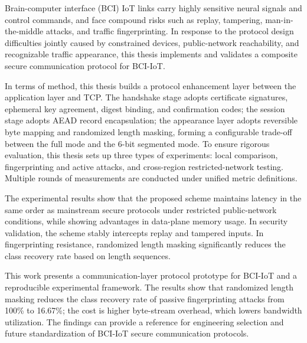 \begin{englishabstract}
Brain-computer interface (BCI) IoT links carry highly sensitive neural signals and control commands, and face compound risks such as replay, tampering, man-in-the-middle attacks, and traffic fingerprinting. In response to the protocol design difficulties jointly caused by constrained devices, public-network reachability, and recognizable traffic appearance, this thesis implements and validates a composite secure communication protocol for BCI-IoT.

In terms of method, this thesis builds a protocol enhancement layer between the application layer and TCP. The handshake stage adopts certificate signatures, ephemeral key agreement, digest binding, and confirmation codes; the session stage adopts AEAD record encapsulation; the appearance layer adopts reversible byte mapping and randomized length masking, forming a configurable trade-off between the full mode and the 6-bit segmented mode. To ensure rigorous evaluation, this thesis sets up three types of experiments: local comparison, fingerprinting and active attacks, and cross-region restricted-network testing. Multiple rounds of measurements are conducted under unified metric definitions.

The experimental results show that the proposed scheme maintains latency in the same order as mainstream secure protocols under restricted public-network conditions, while showing advantages in data-plane memory usage. In security validation, the scheme stably intercepts replay and tampered inputs. In fingerprinting resistance, randomized length masking significantly reduces the class recovery rate based on length sequences.

This work presents a communication-layer protocol prototype for BCI-IoT and a reproducible experimental framework. The results show that randomized length masking reduces the class recovery rate of passive fingerprinting attacks from 100\% to 16.67\%; the cost is higher byte-stream overhead, which lowers bandwidth utilization. The findings can provide a reference for engineering selection and future standardization of BCI-IoT secure communication protocols.

\end{englishabstract}
